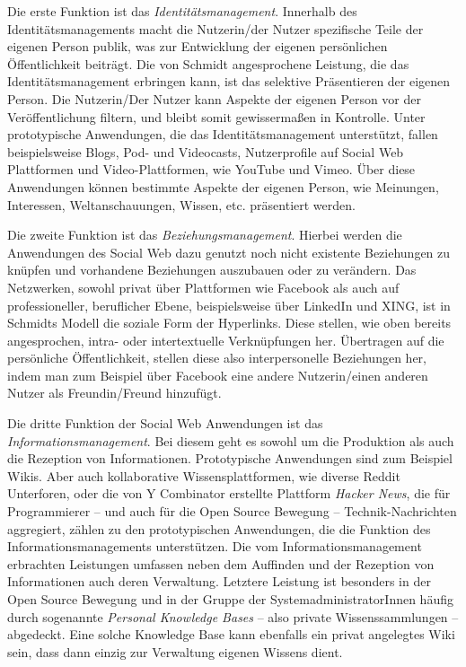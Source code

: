 Die erste Funktion ist das \textit{Identitätsmanagement}. Innerhalb des Identitätsmanagements macht die Nutzerin/der Nutzer spezifische Teile der eigenen Person publik, was zur Entwicklung der eigenen persönlichen Öffentlichkeit beiträgt. Die von Schmidt angesprochene Leistung, die das Identitätsmanagement erbringen kann, ist das selektive Präsentieren der eigenen Person. Die Nutzerin/Der Nutzer kann Aspekte der eigenen Person vor der Veröffentlichung filtern, und bleibt somit gewissermaßen in Kontrolle. Unter prototypische Anwendungen, die das Identitätsmanagement unterstützt, fallen beispielsweise Blogs, Pod- und Videocasts, Nutzerprofile auf Social Web Plattformen und Video-Plattformen, wie YouTube und Vimeo. Über diese Anwendungen können bestimmte Aspekte der eigenen Person, wie Meinungen, Interessen, Weltanschauungen, Wissen, etc. präsentiert werden.

Die zweite Funktion ist das \textit{Beziehungsmanagement}. Hierbei werden die Anwendungen des Social Web dazu genutzt noch nicht existente Beziehungen zu knüpfen und vorhandene Beziehungen auszubauen oder zu verändern. Das Netzwerken, sowohl privat über Plattformen wie Facebook als auch auf professioneller, beruflicher Ebene, beispielsweise über LinkedIn und XING, ist in Schmidts Modell die soziale Form der Hyperlinks. Diese stellen, wie oben bereits angesprochen, intra- oder intertextuelle Verknüpfungen her. Übertragen auf die persönliche Öffentlichkeit, stellen diese also interpersonelle Beziehungen her, indem man zum Beispiel über Facebook eine andere Nutzerin/einen anderen Nutzer als Freundin/Freund hinzufügt.

Die dritte Funktion der Social Web Anwendungen ist das \textit{Informationsmanagement}. Bei diesem geht es sowohl um die Produktion als auch die Rezeption von Informationen. Prototypische Anwendungen sind zum Beispiel Wikis. Aber auch kollaborative Wissensplattformen, wie diverse Reddit Unterforen, oder die von Y Combinator erstellte Plattform \textit{Hacker News}, die für Programmierer  -- und auch für die Open Source Bewegung -- Technik-Nachrichten aggregiert, zählen zu den prototypischen Anwendungen, die die Funktion des Informationsmanagements unterstützen. Die vom Informationsmanagement erbrachten Leistungen umfassen neben dem Auffinden und der Rezeption von Informationen auch deren Verwaltung. Letztere Leistung ist besonders in der Open Source Bewegung und in der Gruppe der SystemadministratorInnen häufig durch sogenannte \textit{Personal Knowledge Bases} -- also private Wissenssammlungen -- abgedeckt. Eine solche Knowledge Base kann ebenfalls ein privat angelegtes Wiki sein, dass dann einzig zur Verwaltung eigenen Wissens dient.

